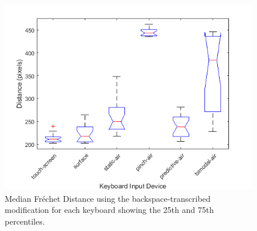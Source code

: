 \begin{figure}[t]
	\centering
	\includegraphics{Figures/fig_frechet_back_boxplot}
	\caption[Fr\'echet Distance Boxplot for Modified-backspace]{Median Fr\'echet Distance using the backspace-transcribed modification for each keyboard showing the 25th and 75th percentiles.}
	\label{fig_frechet_back_boxplot}
\end{figure}

